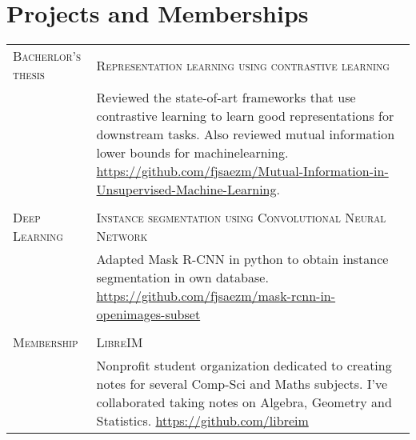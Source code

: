 \documentclass[a4paper,11pt]{article} %
\begin{document}
\section{Projects and Memberships}

\begin{tabular}{p{3cm}|p{11cm}}
  \textsc{Bacherlor's thesis}                & \textsc{Representation learning using contrastive learning}                                                                                                                                                                                                           \\
  & \footnotesize Reviewed the state-of-art frameworks that use contrastive learning to learn good representations for downstream tasks. Also reviewed mutual information lower bounds for machinelearning. \url{https://github.com/fjsaezm/Mutual-Information-in-Unsupervised-Machine-Learning}.                                                              \\


  \multicolumn{2}{c}{}                                                                                                                                                                                                                                                                \\

  \textsc{Deep Learning} & \textsc{Instance segmentation using Convolutional Neural Network} \\
                                         & \footnotesize Adapted Mask R-CNN in python to obtain instance segmentation in own database. \href{https://github.com/fjsaezm/mask-rcnn-in-openimages-subset}{https://github.com/fjsaezm/mask-rcnn-in-openimages-subset} \\


  \multicolumn{2}{c}{}                                                                                                                                                                                                                                                                \\
  \textsc{Membership}                    & \textsc{LibreIM}                                                                                                                                                                                                                           \\
                                         & \footnotesize Nonprofit student organization dedicated to creating notes for several Comp-Sci and Maths subjects. I've collaborated taking notes on Algebra, Geometry and Statistics.
  \href{https://github.com/libreim}{https://github.com/libreim}                                                                                                                                                                                                                       \\


\end{tabular}
\end{document}
